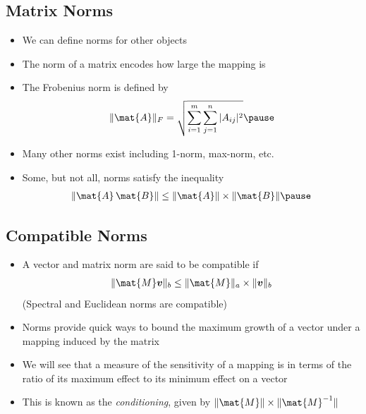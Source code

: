 \begin{slide}
\section[-2]{Matrix Norms}

\begin{PauseHighLight}
  \begin{itemize}
  \item We can define norms for other objects\pause
  \item The norm of a matrix encodes how large the mapping is\pause
  \item The Frobenius norm is defined by
    \begin{align*}
      \| \mat{A} \|_F = \sqrt{\sum_{i=1}^m \sum_{j=1}^n |A_{ij}|^2}\pause
    \end{align*}
  \item Many other norms exist including 1-norm, max-norm, etc.\pause
  \item Some, but not all, norms satisfy the inequality
    \begin{align*}
      \| \mat{A}\,\mat{B} \| \leq \| \mat{A} \| \times \| \mat{B} \|\pause
    \end{align*}
  \end{itemize}
\end{PauseHighLight}

\end{slide}


\begin{slide}
\section[-2]{Compatible Norms}

\begin{PauseHighLight}
  \begin{itemize}
  \item A vector and matrix norm are said to be compatible if
    \begin{align*}
      \| \mat{M} \bm{v} \|_b \leq \| \mat{M} \|_a \times \| \bm{v} \|_b
    \end{align*}
    (Spectral and Euclidean norms are compatible)\pause
  \item Norms provide quick ways to bound the maximum growth of a vector
    under a mapping induced by the matrix\pause
  \item We will see that a measure of the sensitivity of a mapping is in
    terms of the ratio of its maximum effect to its minimum effect on a
    vector\pause
  \item This is known as the \emph{conditioning}, given by
    $\|\mat{M}\| \times \|\mat{M}^{-1}\|$\pause
  \end{itemize}
\end{PauseHighLight}


\end{slide}


